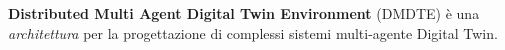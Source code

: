 %
%
%
%
\parbox{1.0\textwidth}{
	\textbf{Distributed Multi Agent Digital Twin Environment} (DMDTE) è una \textit{architettura} per la progettazione di complessi sistemi multi-agente Digital Twin.
}
\medskip

